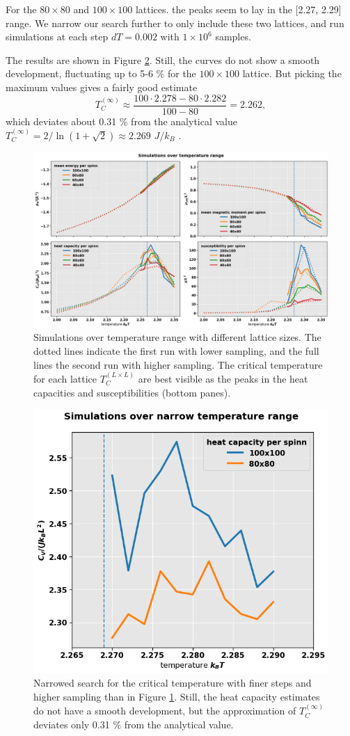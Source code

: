 \documentclass[]{article}
\begin{document}
For the $80 \times 80$ and $100 \times 100$ lattices. the peaks seem to lay in the [2.27, 2.29] range. We narrow our search further to only include these two lattices, and run simulations at each step $dT = 0.002$ with $1 \times 10^6$ samples. 

The results are shown in Figure \ref{fig:temp-range-unall}. Still, the curves do not show a smooth development, fluctuating up to 5-6 \% for the $100 \times 100$ lattice. But picking the maximum values gives a fairly good estimate
\begin{equation}
	T_C^{(\infty)} \approx \frac{100 \cdot 2.278 - 80 \cdot 2.282}{100 - 80} = 2.262,
\end{equation}
which deviates about 0.31 \% from the analytical value $T_C^{(\infty)} = 2/\ln (1 + \sqrt{2}) \approx 2.269$ $J/k_B$ \cite{fys4150-p4}.

\begin{figure}[!h]
	\centering
	\includegraphics[width=1\linewidth]{./figs/temp-range-all.png}
	\caption{Simulations over temperature range with different lattice sizes. The dotted lines indicate the first run with lower sampling, and the full lines the second run with higher sampling. The critical temperature for each lattice $T_C^{(L \times L)}$ are best visible as the peaks in the heat capacities and susceptibilities (bottom panes).}
	\label{fig:temp-range-all}
\end{figure}


\begin{figure}[!h]
	\centering
	\includegraphics[width=.5\linewidth]{./figs/temp-range-unall.png}
	\caption{Narrowed search for the critical temperature with finer steps and higher sampling than in Figure \ref{fig:temp-range-all}. Still, the heat capacity estimates do not have a smooth development, but the approximation of $T_C^{(\infty)}$ deviates only 0.31 \% from the analytical value.}
	\label{fig:temp-range-unall}
\end{figure}
\end{document}
